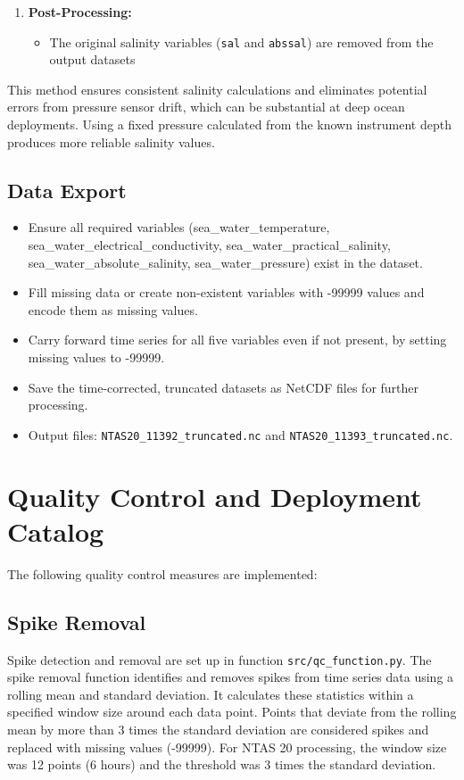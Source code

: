 \documentclass[11pt]{article}
\newcommand{\projectname}{NTAS}  %
\newcommand{\casenumber}{20}  %
\newcommand{\FirstInstrument}{11392}
\newcommand{\SecondInstrument}{11393}
\newcommand{\WindowSize}{12}  %
\newcommand{\ThresholdValue}{3}  %
\begin{document}
\begin{enumerate}
    \item \textbf{Post-Processing:}
    \begin{itemize}
        \item The original salinity variables (\texttt{sal} and \texttt{abssal}) are removed from the output datasets
    \end{itemize}
\end{enumerate}

This method ensures consistent salinity calculations and eliminates potential errors from pressure sensor drift, 
which can be substantial at deep ocean deployments. 
Using a fixed pressure calculated from the known instrument depth produces more reliable salinity values.

\subsection{Data Export}

\begin{itemize}
\item Ensure all required variables (sea\_water\_temperature, sea\_water\_electrical\_conductivity, sea\_water\_practical\_salinity, sea\_water\_absolute\_salinity, sea\_water\_pressure) exist in the dataset.
\item Fill missing data or create non-existent variables with -99999 values and encode them as missing values.
\item Carry forward time series for all five variables even if not present, by setting missing values to -99999.
\item Save the time-corrected, truncated datasets as NetCDF files for further processing.
\item Output files: 
\texttt{\projectname\casenumber\_\FirstInstrument\_truncated.nc}
and \texttt{\projectname\casenumber\_\SecondInstrument\_truncated.nc}.
\end{itemize}


\section{Quality Control and Deployment Catalog}
The following quality control measures are implemented:

\subsection{Spike Removal}
Spike detection and removal are set up in function \texttt{src/qc\_function.py}. 
The spike removal function identifies and removes spikes from time series data using a rolling mean and standard deviation. 
It calculates these statistics within a specified window size around each data point. 
Points that deviate from the rolling mean by more than \ThresholdValue{} times the standard deviation are considered spikes and replaced with missing values (-99999). 
For \projectname{} \casenumber{} processing, the window size was \WindowSize{} points (6 hours) and the threshold was \ThresholdValue{} times the standard deviation.
\end{document}
